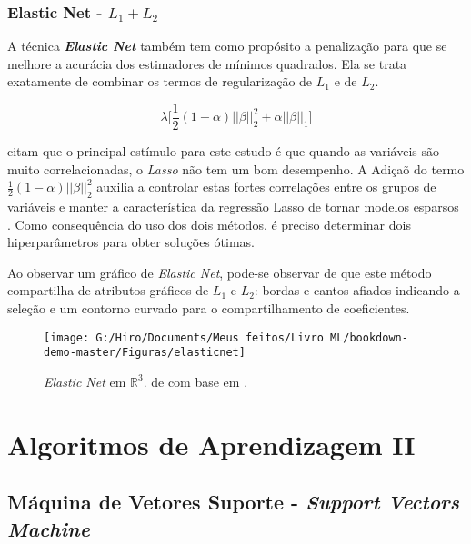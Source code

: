 \documentclass[
  openany]{book}
\begin{document}
\hypertarget{elasticnet}{%
\subsection{\texorpdfstring{Elastic Net - \(L_1+L_2\)}{Elastic Net - L\_1+L\_2}}\label{elasticnet}}

A técnica \textbf{\emph{Elastic Net}} \citep{zou2005regularization} também tem como propósito a penalização para que se melhore a acurácia dos estimadores de mínimos quadrados. Ela se trata exatamente de combinar os termos de regularização de \(L_1\) e de \(L_2\).

\begin{equation}
    \lambda\bigg[ \frac{1}{2}(1-\alpha)||\beta||_2^2+\alpha||\beta||_1\bigg]
  \label{eq:elsticnet}
\end{equation}

\citet{hastie2015statistical} citam que o principal estímulo para este estudo é que quando as variáveis são muito correlacionadas, o \emph{Lasso} não tem um bom desempenho. A Adiçaõ do termo \(\frac{1}{2}(1-\alpha)||\beta||^2_2\) auxilia a controlar estas fortes correlações entre os grupos de variáveis e manter a característica da regressão Lasso de tornar modelos esparsos \citep{silva2018tecnica}. Como consequência do uso dos dois métodos, é preciso determinar dois hiperparâmetros para obter soluções ótimas.

Ao observar um gráfico de \emph{Elastic Net}, pode-se observar de que este método compartilha de atributos gráficos de \(L_1\) e \(L_2\): bordas e cantos afiados indicando a seleção e um contorno curvado para o compartilhamento de coeficientes.

\begin{figure}

{\centering \texttt{[image: G:/Hiro/Documents/Meus feitos/Livro ML/bookdown-demo-master/Figuras/elasticnet]} 

}

\caption{\emph{Elastic Net} em \(\mathbb{R}^3\). de \citet{silva2018tecnica} com base em \citet{hastie2015statistical}.}\label{fig:elasticnet}
\end{figure}



\hypertarget{ptII}{%
\chapter{Algoritmos de Aprendizagem II}\label{ptII}}

\hypertarget{svm}{%
\section{\texorpdfstring{Máquina de Vetores Suporte - \emph{Support Vectors Machine}}{Máquina de Vetores Suporte - Support Vectors Machine}}\label{svm}}
\end{document}
